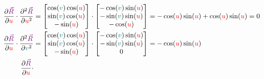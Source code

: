 \begin{align*}
    \frac{\partial \begingroup\color{violet}\vec{R}\endgroup}{\partial \begingroup\color{red}u\endgroup} \cdot
    \frac{\partial^2 \begingroup\color{violet}\vec{R}\endgroup}{\partial \begingroup\color{red}u\endgroup^2} &= 
    \begin{bmatrix}
        \cos(\begingroup\color{teal}v\endgroup)\cos(\begingroup\color{red}u\endgroup)\\
        \sin(\begingroup\color{teal}v\endgroup)\cos(\begingroup\color{red}u\endgroup)\\
        -\sin(\begingroup\color{red}u\endgroup)
    \end{bmatrix} \cdot
    \begin{bmatrix}
        -\cos(\begingroup\color{teal}v\endgroup)\sin(\begingroup\color{red}u\endgroup)\\
        -\sin(\begingroup\color{teal}v\endgroup)\sin(\begingroup\color{red}u\endgroup)\\
        -\cos(\begingroup\color{red}u\endgroup)
    \end{bmatrix} = -\cos(\begingroup\color{red}u\endgroup)\sin(\begingroup\color{red}u\endgroup) + \cos(\begingroup\color{red}u\endgroup)\sin(\begingroup\color{red}u\endgroup) = 0
\\
    \frac{\partial \begingroup\color{violet}\vec{R}\endgroup}{\partial \begingroup\color{red}u\endgroup} \cdot
    \frac{\partial^2 \begingroup\color{violet}\vec{R}\endgroup}{\partial \begingroup\color{teal}v\endgroup^2} &= 
    \begin{bmatrix}
        \cos(\begingroup\color{teal}v\endgroup)\cos(\begingroup\color{red}u\endgroup)\\
        \sin(\begingroup\color{teal}v\endgroup)\cos(\begingroup\color{red}u\endgroup)\\
        -\sin(\begingroup\color{red}u\endgroup)
    \end{bmatrix} \cdot
    \begin{bmatrix}
        -\cos(\begingroup\color{teal}v\endgroup)\sin(\begingroup\color{red}u\endgroup)\\
        -\sin(\begingroup\color{teal}v\endgroup)\sin(\begingroup\color{red}u\endgroup)\\
        0
    \end{bmatrix} = -\cos(\begingroup\color{red}u\endgroup)\sin(\begingroup\color{red}u\endgroup)
\\
    \frac{\partial \begingroup\color{violet}\vec{R}\endgroup}{\partial \begingroup\color{red}u\endgroup} \cdot

\end{align*}
